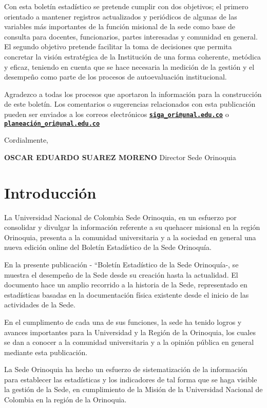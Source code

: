 \documentclass[
]{book}
\begin{document}
Con esta boletín estadístico se pretende cumplir con dos objetivos; el primero orientado a mantener registros actualizados y periódicos de algunas de las variables más importantes de la función misional de la sede como base de consulta para docentes, funcionarios, partes interesadas y comunidad en general. El segundo objetivo pretende facilitar la toma de decisiones que permita concretar la visión estratégica de la Institución de una forma coherente, metódica y eficaz, teniendo en cuenta que se hace necesaria la medición de la gestión y el desempeño como parte de los procesos de autoevaluación institucional.

Agradezco a todas los procesos que aportaron la información para la construcción de este boletín. Los comentarios o sugerencias relacionados con esta publicación pueden ser enviados a los correos electrónicos \textbf{\href{mailto:siga_ori@unal.edu.co}{\nolinkurl{siga\_ori@unal.edu.co}}} o \textbf{\href{mailto:planeación_ori@unal.edu.co}{\nolinkurl{planeación\_ori@unal.edu.co}}}

Cordialmente,

\textbf{OSCAR EDUARDO SUAREZ MORENO}
Director Sede Orinoquia

\hypertarget{intro}{%
\chapter*{Introducción}\label{intro}}

La Universidad Nacional de Colombia Sede Orinoquia, en un esfuerzo por consolidar y divulgar la información referente a su quehacer misional en la región Orinoquia, presenta a la comunidad universitaria y a la sociedad en general una nueva edición online del Boletín Estadístico de la Sede Orinoquía.

En la presente publicación - ``Boletín Estadístico de la Sede Orinoquía-, se muestra el desempeño de la Sede desde su creación hasta la actualidad. El documento hace un amplio recorrido a la historia de la Sede, representado en estadísticas basadas en la documentación física existente desde el inicio de las actividades de la Sede.

En el cumplimento de cada una de sus funciones, la sede ha tenido logros y avances importantes para la Universidad y la Región de la Orinoquia, los cuales se dan a conocer a la comunidad universitaria y a la opinión pública en general mediante esta publicación.

La Sede Orinoquia ha hecho un esfuerzo de sistematización de la información para establecer las estadísticas y los indicadores de tal forma que se haga visible la gestión de la Sede, en cumplimiento de la Misión de la Universidad Nacional de Colombia en la región de la Orinoquia.
\end{document}
